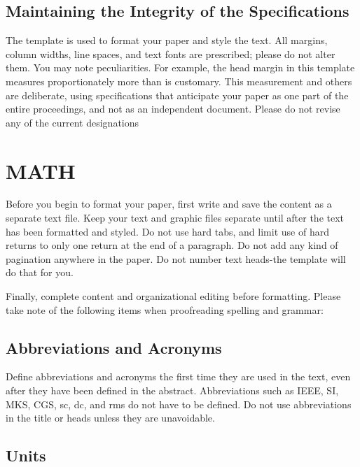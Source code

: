 \documentclass[a4paper, 10pt, conference]{ieeeconf}
\begin{document}
\subsection{Maintaining the Integrity of the Specifications}

The template is used to format your paper and style the text. All margins, column widths, line spaces, and text fonts are prescribed; please do not alter them. You may note peculiarities. For example, the head margin in this template measures proportionately more than is customary. This measurement and others are deliberate, using specifications that anticipate your paper as one part of the entire proceedings, and not as an independent document. Please do not revise any of the current designations

\section{MATH}

Before you begin to format your paper, first write and save the content as a separate text file. Keep your text and graphic files separate until after the text has been formatted and styled. Do not use hard tabs, and limit use of hard returns to only one return at the end of a paragraph. Do not add any kind of pagination anywhere in the paper. Do not number text heads-the template will do that for you.

Finally, complete content and organizational editing before formatting. Please take note of the following items when proofreading spelling and grammar:

\subsection{Abbreviations and Acronyms} Define abbreviations and acronyms the first time they are used in the text, even after they have been defined in the abstract. Abbreviations such as IEEE, SI, MKS, CGS, sc, dc, and rms do not have to be defined. Do not use abbreviations in the title or heads unless they are unavoidable.

\subsection{Units}
\end{document}
